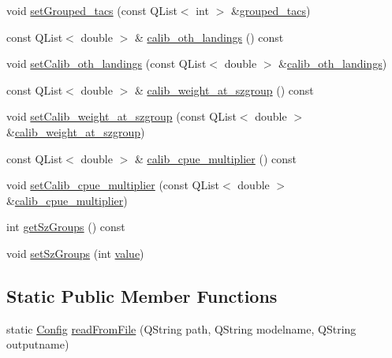 \begin{DoxyCompactItemize}
\item 
void \mbox{\hyperlink{class_config_ab3c3dad78f4f4733f6db9c02b6c6444d}{set\+Grouped\+\_\+tacs}} (const Q\+List$<$ int $>$ \&\mbox{\hyperlink{class_config_a6627eb314eacce2817c04811826a3a65}{grouped\+\_\+tacs}})
\item 
const Q\+List$<$ double $>$ \& \mbox{\hyperlink{class_config_a7280b5ac9f8b20f5d387d1a2f4d27422}{calib\+\_\+oth\+\_\+landings}} () const
\item 
void \mbox{\hyperlink{class_config_a4d9c889cb646c899b2e3bf88f3fbbb9f}{set\+Calib\+\_\+oth\+\_\+landings}} (const Q\+List$<$ double $>$ \&\mbox{\hyperlink{class_config_a7280b5ac9f8b20f5d387d1a2f4d27422}{calib\+\_\+oth\+\_\+landings}})
\item 
const Q\+List$<$ double $>$ \& \mbox{\hyperlink{class_config_a27d6d3da20e0caa6d8aa74426293e845}{calib\+\_\+weight\+\_\+at\+\_\+szgroup}} () const
\item 
void \mbox{\hyperlink{class_config_a1d4cbc8598711100f6abd67f8d278855}{set\+Calib\+\_\+weight\+\_\+at\+\_\+szgroup}} (const Q\+List$<$ double $>$ \&\mbox{\hyperlink{class_config_a27d6d3da20e0caa6d8aa74426293e845}{calib\+\_\+weight\+\_\+at\+\_\+szgroup}})
\item 
const Q\+List$<$ double $>$ \& \mbox{\hyperlink{class_config_afcd156348309481d3b0d05b68ce1a7a7}{calib\+\_\+cpue\+\_\+multiplier}} () const
\item 
void \mbox{\hyperlink{class_config_a0a1b15fba3e853b4f9aba8b91277d3b4}{set\+Calib\+\_\+cpue\+\_\+multiplier}} (const Q\+List$<$ double $>$ \&\mbox{\hyperlink{class_config_afcd156348309481d3b0d05b68ce1a7a7}{calib\+\_\+cpue\+\_\+multiplier}})
\item 
int \mbox{\hyperlink{class_config_a9f5e6aa3773ebdfdd05d0d042731565e}{get\+Sz\+Groups}} () const
\item 
void \mbox{\hyperlink{class_config_a19b1b398c3978c67c0bd2502a3be438a}{set\+Sz\+Groups}} (int \mbox{\hyperlink{diffusion_8cpp_a4b41795815d9f3d03abfc739e666d5da}{value}})
\end{DoxyCompactItemize}
\subsection*{Static Public Member Functions}
\begin{DoxyCompactItemize}
\item 
static \mbox{\hyperlink{class_config}{Config}} \mbox{\hyperlink{class_config_a65ac3dd592c155c8153efee9ef2eb9f0}{read\+From\+File}} (Q\+String path, Q\+String modelname, Q\+String outputname)
\end{DoxyCompactItemize}
